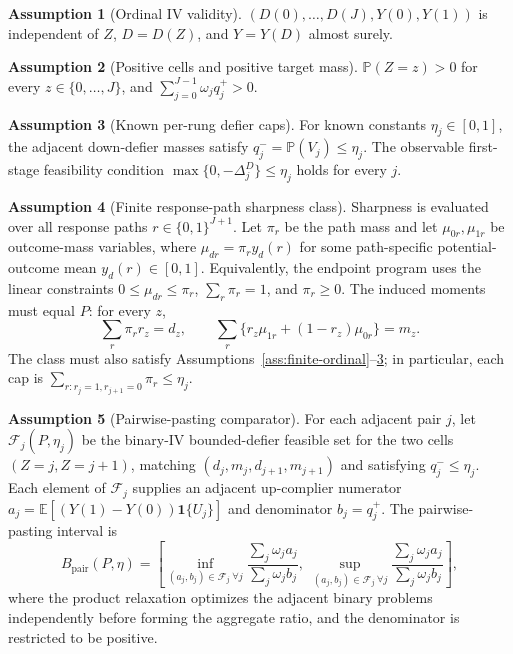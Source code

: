 \documentclass[11pt]{article}
\newcommand{\E}{\mathbb{E}}
\renewcommand{\Pr}{\mathbb{P}}
\newcommand{\one}{\mathbf{1}}
\theoremstyle{definition}
\newtheorem{assumption}{Assumption}
\theoremstyle{plain}
\theoremstyle{remark}
\begin{document}
\begin{assumption}[Ordinal IV validity]\label{ass:ord-iv}
\((D(0),\ldots,D(J),Y(0),Y(1))\) is independent of \(Z\), \(D=D(Z)\), and \(Y=Y(D)\) almost surely.
\end{assumption}

\begin{assumption}[Positive cells and positive target mass]\label{ass:positive}
\(\Pr(Z=z)>0\) for every \(z\in\{0,\ldots,J\}\), and \(\sum_{j=0}^{J-1}\omega_j q^+_j>0\).
\end{assumption}

\begin{assumption}[Known per-rung defier caps]\label{ass:defier-caps}
For known constants \(\eta_j\in[0,1]\), the adjacent down-defier masses satisfy \(q^-_j=\Pr(V_j)\le\eta_j\).  The observable first-stage feasibility condition \(\max\{0,-\Delta^D_j\}\le\eta_j\) holds for every \(j\).
\end{assumption}

\begin{assumption}[Finite response-path sharpness class]\label{ass:finite-types}
Sharpness is evaluated over all response paths \(r\in\{0,1\}^{J+1}\).  Let \(\pi_r\) be the path mass and let \(\mu_{0r},\mu_{1r}\) be outcome-mass variables, where \(\mu_{dr}=\pi_r y_d(r)\) for some path-specific potential-outcome mean \(y_d(r)\in[0,1]\).  Equivalently, the endpoint program uses the linear constraints \(0\le\mu_{dr}\le\pi_r\), \(\sum_r\pi_r=1\), and \(\pi_r\ge0\).  The induced moments must equal \(P\): for every \(z\),
\[
\sum_r \pi_r r_z=d_z,\qquad
\sum_r \{r_z\mu_{1r}+(1-r_z)\mu_{0r}\}=m_z.
\]
The class must also satisfy Assumptions~\ref{ass:finite-ordinal}--\ref{ass:defier-caps}; in particular, each cap is \(\sum_{r:r_j=1,r_{j+1}=0}\pi_r\le\eta_j\).
\end{assumption}

\begin{assumption}[Pairwise-pasting comparator]\label{ass:pairwise}
For each adjacent pair \(j\), let \(\mathcal F_j(P,\eta_j)\) be the binary-IV bounded-defier feasible set for the two cells \((Z=j,Z=j+1)\), matching \((d_j,m_j,d_{j+1},m_{j+1})\) and satisfying \(q^-_j\le\eta_j\).  Each element of \(\mathcal F_j\) supplies an adjacent up-complier numerator \(a_j=\E[(Y(1)-Y(0))\one\{U_j\}]\) and denominator \(b_j=q^+_j\).  The pairwise-pasting interval is
\[
B_{\mathrm{pair}}(P,\eta)=
\left[
\inf_{(a_j,b_j)\in\mathcal F_j\ \forall j}
\frac{\sum_j\omega_j a_j}{\sum_j\omega_j b_j},
\;
\sup_{(a_j,b_j)\in\mathcal F_j\ \forall j}
\frac{\sum_j\omega_j a_j}{\sum_j\omega_j b_j}
\right],
\]
where the product relaxation optimizes the adjacent binary problems independently before forming the aggregate ratio, and the denominator is restricted to be positive.
\end{assumption}
\end{document}

